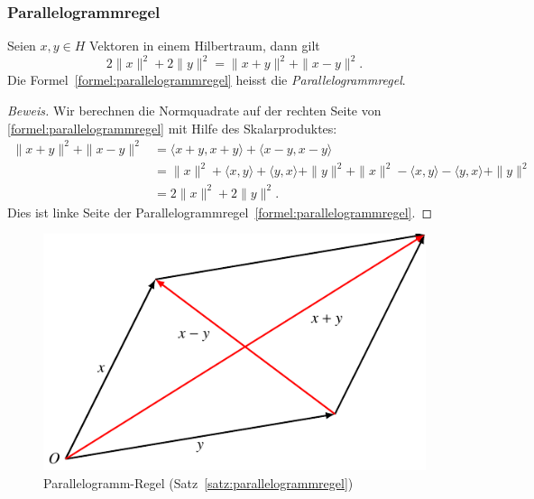 \subsubsection{Parallelogrammregel}
%
\begin{satz}
\label{satz:parallelogrammregel}
Seien $x,y\in H$ Vektoren in einem Hilbertraum, dann gilt
\begin{equation}
2\|x\|^2 + 2\|y\|^2
=
\| x+y\|^2 + \|x-y\|^2.
\label{formel:parallelogrammregel}
\end{equation}
Die Formel~\eqref{formel:parallelogrammregel} heisst die
{\em Parallelogrammregel}.
\end{satz}

\begin{proof}[Beweis]
Wir berechnen die Normquadrate auf der rechten Seite von 
\eqref{formel:parallelogrammregel} mit Hilfe des Skalarproduktes:
\begin{align*}
\|x+y\|^2 + \|x-y\|^2
&=
\langle x+y,x+y\rangle + \langle x-y,x-y\rangle
\\
&=
\|x\|^2 + \langle x,y\rangle + \langle y,x\rangle + \|y\|^2
+
\|x\|^2 - \langle x,y\rangle - \langle y,x\rangle + \|y\|^2
\\
&=
2\|x\|^2 + 2\|y\|^2.
\end{align*}
Dies ist linke Seite der Parallelogrammregel~\eqref{formel:parallelogrammregel}.
\end{proof}

\begin{figure}
\centering
\includegraphics{chapters/1-geometrie/images/parallelogramm.pdf}
\caption{Parallelogramm-Regel (Satz~\ref{satz:parallelogrammregel})
\label{figure:parallelogrammregel}}
\end{figure}


